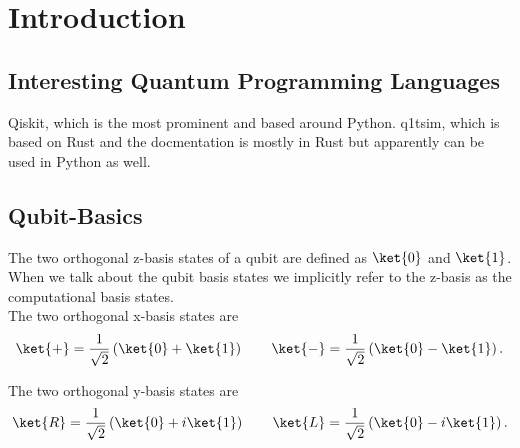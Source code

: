 \chapter{Introduction}
\section{Interesting Quantum Programming Languages}
Qiskit, which is the most prominent and based around Python.
q1tsim, which is based on Rust and the docmentation is mostly in Rust
but apparently can be used in Python as well.
\section{Qubit-Basics}
The two orthogonal z-basis states of a qubit are defined as $\ket{0}$
and $\ket{1}$. When we talk about the qubit basis states we implicitly
refer to the z-basis as the computational basis states.\\
The two orthogonal x-basis states are
\begin{equation}
  \label{eq:4}
  \ket{+} = \frac{1}{\sqrt{2}}\left(\ket{0}+\ket{1}\right) \qquad
  \ket{-} = \frac{1}{\sqrt{2}}\left(\ket{0}-\ket{1}\right).
\end{equation}

The two orthogonal y-basis states are
\begin{equation}
  \label{eq:4}
  \ket{R} = \frac{1}{\sqrt{2}}\left(\ket{0}+i\ket{1}\right) \qquad
  \ket{L} = \frac{1}{\sqrt{2}}\left(\ket{0}-i\ket{1}\right).
\end{equation}
